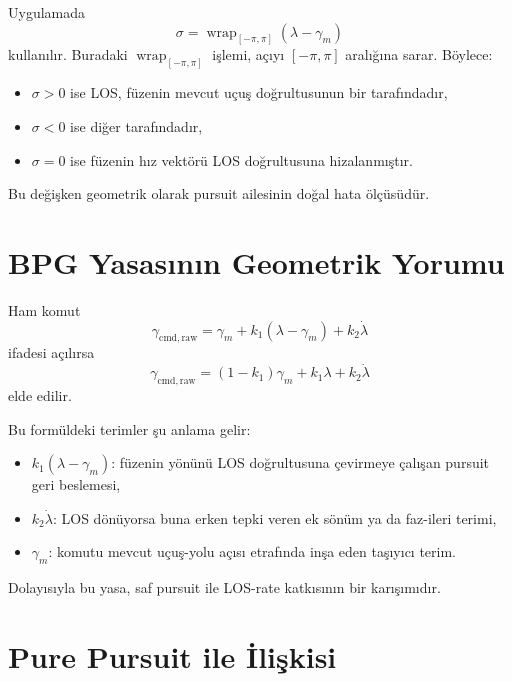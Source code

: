 \documentclass[11pt,a4paper]{article}
\begin{document}
Uygulamada
\begin{equation}
\sigma = \operatorname{wrap}_{[-\pi,\pi]}\!\left(\lambda-\gamma_m\right)
\end{equation}
kullanılır. Buradaki \(\operatorname{wrap}_{[-\pi,\pi]}\) işlemi, açıyı \([-\pi,\pi]\) aralığına sarar. Böylece:
\begin{itemize}[leftmargin=1.2cm]
  \item \(\sigma > 0\) ise LOS, füzenin mevcut uçuş doğrultusunun bir tarafındadır,
  \item \(\sigma < 0\) ise diğer tarafındadır,
  \item \(\sigma = 0\) ise füzenin hız vektörü LOS doğrultusuna hizalanmıştır.
\end{itemize}

Bu değişken geometrik olarak pursuit ailesinin doğal hata ölçüsüdür.

\section{BPG Yasasının Geometrik Yorumu}

Ham komut
\begin{equation}
\gamma_{\mathrm{cmd,raw}}
=
\gamma_m + k_1(\lambda-\gamma_m) + k_2\dot{\lambda}
\end{equation}
ifadesi açılırsa
\begin{equation}
\gamma_{\mathrm{cmd,raw}}
=
(1-k_1)\gamma_m + k_1 \lambda + k_2\dot{\lambda}
\label{eq:bpg_expanded}
\end{equation}
elde edilir.

Bu formüldeki terimler şu anlama gelir:
\begin{itemize}[leftmargin=1.2cm]
  \item \(k_1(\lambda-\gamma_m)\): füzenin yönünü LOS doğrultusuna çevirmeye çalışan pursuit geri beslemesi,
  \item \(k_2\dot{\lambda}\): LOS dönüyorsa buna erken tepki veren ek sönüm ya da faz-ileri terimi,
  \item \(\gamma_m\): komutu mevcut uçuş-yolu açısı etrafında inşa eden taşıyıcı terim.
\end{itemize}

Dolayısıyla bu yasa, saf pursuit ile LOS-rate katkısının bir karışımıdır.

\section{Pure Pursuit ile İlişkisi}
\end{document}
